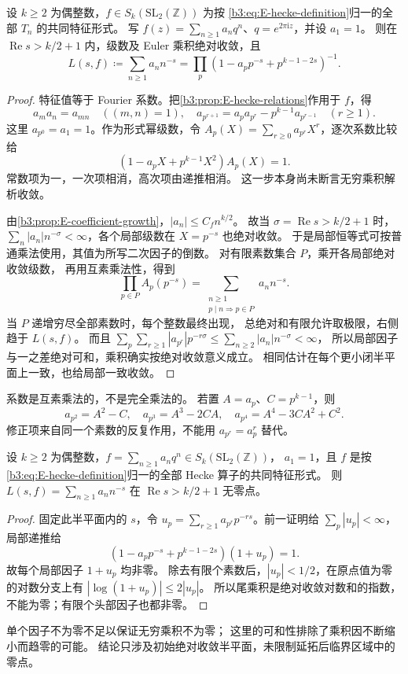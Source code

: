 \begin{theorem}[特征形式的乘积]\label{b3:thm:E-euler-product}
设 \(k\ge2\) 为偶整数，\(f\in S_k(\mathrm{SL}_2(\mathbb Z))\) 为按
\eqref{b3:eq:E-hecke-definition}归一的全部 \(T_n\) 的共同特征形式。
写 \(f(z)=\sum_{n\ge1}a_nq^n\)、\(q=e^{2\pi\mathrm i z}\)，并设 \(a_1=1\)。
则在 \(\operatorname{Re}s>k/2+1\) 内，级数及 Euler 乘积绝对收敛，且
\[
 L(s,f)\coloneqq\sum_{n\ge1}a_nn^{-s}
       =\prod_p(1-a_pp^{-s}+p^{k-1-2s})^{-1}.
\]
\end{theorem}
\begin{proof}
特征值等于 Fourier 系数。把\cref{b3:prop:E-hecke-relations}作用于 \(f\)，得
\[
 a_ma_n=a_{mn}\quad((m,n)=1),\quad
 a_{p^{r+1}}=a_pa_{p^r}-p^{k-1}a_{p^{r-1}}\quad(r\ge1).
\]
这里 \(a_{p^0}=a_1=1\)。作为形式幂级数，令
\(A_p(X)=\sum_{r\ge0}a_{p^r}X^r\)，逐次系数比较给
\[
 (1-a_pX+p^{k-1}X^2)A_p(X)=1.
\]
常数项为一，一次项相消，高次项由递推相消。
这一步本身尚未断言无穷乘积解析收敛。

由\cref{b3:prop:E-coefficient-growth}，\(|a_n|\le C_f n^{k/2}\)。
故当 \(\sigma=\operatorname{Re}s>k/2+1\) 时，
\(\sum_n|a_n|n^{-\sigma}<\infty\)，各个局部级数在 \(X=p^{-s}\) 也绝对收敛。
于是局部恒等式可按普通乘法使用，其值为所写二次因子的倒数。
对有限素数集合 \(P\)，乘开各局部绝对收敛级数，
再用互素乘法性，得到
\[
 \prod_{p\in P}A_p(p^{-s})
 =\sum_{\substack{n\ge1\\p\mid n\Rightarrow p\in P}}a_nn^{-s}.
\]
当 \(P\) 递增穷尽全部素数时，每个整数最终出现，
总绝对和有限允许取极限，右侧趋于 \(L(s,f)\)。
而且
\(\sum_p\sum_{r\ge1}|a_{p^r}|p^{-r\sigma}\le\sum_{n\ge2}|a_n|n^{-\sigma}<\infty\)，
所以局部因子与一之差绝对可和，乘积确实按绝对收敛意义成立。
相同估计在每个更小闭半平面上一致，也给局部一致收敛。
\end{proof}
系数是互素乘法的，不是完全乘法的。
若置 \(A=a_p\)、\(C=p^{k-1}\)，则
\[
 a_{p^2}=A^2-C,\quad a_{p^3}=A^3-2CA,\quad
 a_{p^4}=A^4-3CA^2+C^2.
\]
修正项来自同一个素数的反复作用，不能用 \(a_{p^r}=a_p^r\) 替代。

\begin{proposition}[初始半平面的无零性]\label{b3:prop:E-initial-zero-free}
设 \(k\ge2\) 为偶整数，\(f=\sum_{n\ge1}a_nq^n\in S_k(\mathrm{SL}_2(\mathbb Z))\)，
\(a_1=1\)，且 \(f\) 是按\eqref{b3:eq:E-hecke-definition}归一的全部 Hecke 算子的共同特征形式。
则 \(L(s,f)=\sum_{n\ge1}a_nn^{-s}\) 在 \(\operatorname{Re}s>k/2+1\) 无零点。
\end{proposition}
\begin{proof}
固定此半平面内的 \(s\)，令
\(u_p=\sum_{r\ge1}a_{p^r}p^{-rs}\)。前一证明给 \(\sum_p|u_p|<\infty\)，
局部递推给
\[
 (1-a_pp^{-s}+p^{k-1-2s})(1+u_p)=1.
\]
故每个局部因子 \(1+u_p\) 均非零。
除去有限个素数后，\(|u_p|<1/2\)，在原点值为零的对数分支上有
\(|\log(1+u_p)|\le2|u_p|\)。
所以尾乘积是绝对收敛对数和的指数，不能为零；有限个头部因子也都非零。
\end{proof}
单个因子不为零不足以保证无穷乘积不为零；
这里的可和性排除了乘积因不断缩小而趋零的可能。
结论只涉及初始绝对收敛半平面，未限制延拓后临界区域中的零点。

